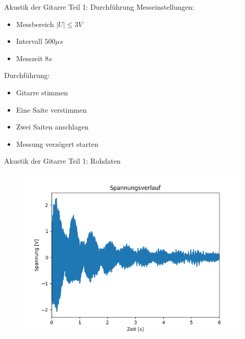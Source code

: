 \documentclass[12pt]{beamer}
\begin{document}
\begin{frame}{Akustik der Gitarre Teil 1: Durchführung}
	Messeinstellungen:
	\begin{itemize}
		\item Messbereich $|U| \leq 3V$
		\item Intervall $500 \mu s$
		\item Messzeit $8s$
	\end{itemize}
	Durchführung:
	\begin{itemize}
		\item Gitarre stimmen
		\item Eine Saite verstimmen
		\item Zwei Saiten anschlagen
		\item Messung verzögert starten
	\end{itemize}
\end{frame}

\begin{frame}{Akustik der Gitarre Teil 1: Rohdaten}
	\begin{figure}
		\includegraphics[scale=0.6]{Bilder/Schwebung_roh.png}
	\end{figure}
\end{frame}
\end{document}
